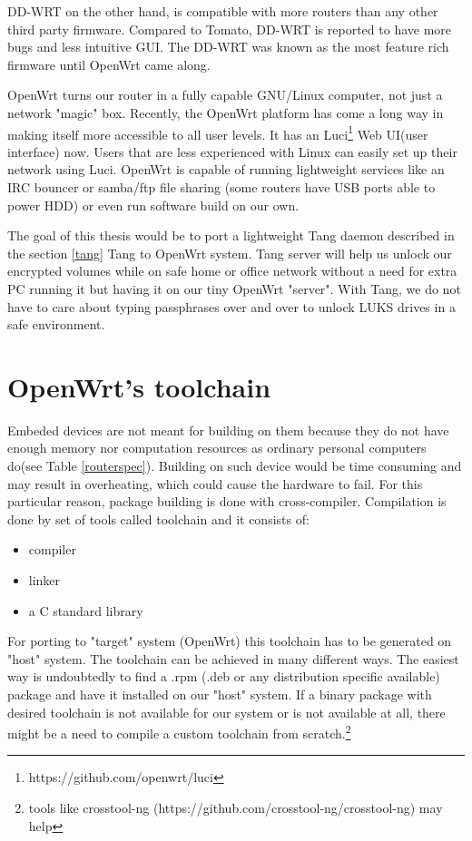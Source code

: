 DD-WRT on the other hand, is compatible with more routers than any other third party firmware.
Compared to Tomato, DD-WRT is reported to have more bugs and less intuitive GUI.
The DD-WRT was known as the most feature rich firmware until OpenWrt came along. %

OpenWrt turns our router in a fully capable GNU/Linux computer, not just a network "magic" box.
Recently, the OpenWrt platform has come a long way in making itself more accessible to all user levels.
It has an Luci\footnote{https://github.com/openwrt/luci} Web UI(user interface) now.
Users that are less experienced with Linux can easily set up their network using Luci.
OpenWrt is capable of running lightweight services like an IRC bouncer or samba/ftp file sharing (some routers have USB ports able to power HDD) or even run software build on our own\cite{vpnpick}.

The goal of this thesis would be to port a lightweight Tang daemon described in the section \ref{tang} Tang to OpenWrt system.
Tang server will help us unlock our encrypted volumes while on safe home or office network without a need for extra PC running it but having it on our tiny OpenWrt "server".
With Tang, we do not have to care about typing passphrases over and over to unlock LUKS drives in a safe environment.



\section{OpenWrt's toolchain}

Embeded devices are not meant for building on them because they do not have enough memory nor computation resources as ordinary personal computers do(see Table \ref{routerspec}).
Building on such device would be time consuming and may result in overheating, which could cause the hardware to fail.
For this particular reason, package building is done with cross-compiler.
Compilation is done by set of tools called toolchain and it consists of:
\begin{itemize}
    \item compiler
    \item linker
    \item a C standard library
\end{itemize}
For porting to "target" system (OpenWrt) this toolchain has to be generated on "host" system.
The toolchain can be achieved in many different ways.
The easiest way is undoubtedly to find a .rpm (.deb or any distribution specific available) package and have it installed on our "host" system.
If a binary package with desired toolchain is not available for our system or is not available at all, there might be a need to compile a custom toolchain from scratch.\footnote{tools like crosstool-ng (https://github.com/crosstool-ng/crosstool-ng) may help}

